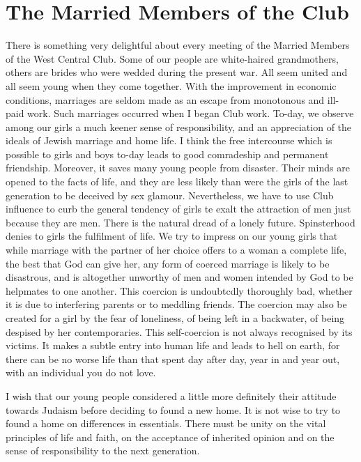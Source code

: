 \chapter{The Married Members of the Club}

There is something very delightful about every meeting
of the Married Members of the West Central Club. Some
of our people are white-haired grandmothers, others are
brides who were wedded during the present war. All seem
united and all seem young when they come together.
With the improvement in economic conditions,
marriages are seldom made as an escape from monotonous
and ill-paid work. Such marriages occurred when I
began Club work. To-day, we observe among our girls a
much keener sense of responsibility, and an appreciation
of the ideals of Jewish marriage and home life. I think
the free intercourse which is possible to girls and boys
to-day leads to good comradeship and permanent friendship.
Moreover, it saves many young people from disaster.
Their minds are opened to the facts of life, and
they are less likely than were the girls of the last generation
to be deceived by sex glamour. Nevertheless, we have
to use Club influence to curb the general tendency of girls
te exalt the attraction of men just because they are men.
There is the natural dread of a lonely future. Spinsterhood
denies to girls the fulfilment of life. We try to impress
on our young girls that while marriage with the
partner of her choice offers to a woman a complete life,
the best that God can give her, any form of coerced
marriage is likely to be disastrous, and is altogether unworthy
of men and women intended by God to be helpmates
to one another. This coercion is undoubtcdly
thoroughly bad, whether it is due to interfering parents or
to meddling friends. The coercion may also be created
for a girl by the fear of loneliness, of being left in a backwater,
of being despised by her contemporaries. This self-coercion
is not always recognised by its victims. It makes
a subtle entry into human life and leads to hell on earth,
for there can be no worse life than that spent day after
day, year in and year out, with an individual you do not
love.

I wish that our young people considered a little more
definitely their attitude towards Judaism before deciding
to found a new home. It is not wise to try to found a
home on differences in essentials. There must be unity
on the vital principles of life and faith, on the acceptance
of inherited opinion and on the sense of responsibility to
the next generation.

